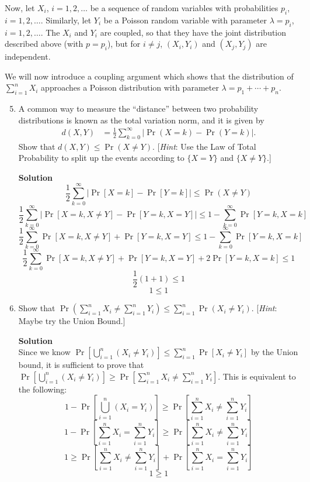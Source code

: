 \documentclass[11pt]{article}
\newenvironment{Parts}{\begin{enumerate}[label=(\alph*)]}{\end{enumerate}}
\newcommand*{\Part}{\item}
\newenvironment{Answer}{\vspace{10pt}\begin{mdframed}\textbf{Solution}\\}{\end{mdframed}\vfill\pagebreak[3]}
\newenvironment{Answer}{\vspace{10pt}}{\vfill\pagebreak[3]}
\begin{document}
Now, let $X_i$, $i = 1, 2, \dotsc$ be a sequence of random variables with probabilities $p_i$, $i = 1, 2, \dotsc$. Similarly, let $Y_i$ be a Poisson random variable with parameter $\lambda = p_i$, $i=1, 2, \dotsc$. The $X_i$ and $Y_i$ are coupled, so that they have the joint distribution described above (with $p = p_i$), but for $i \neq j$, $(X_i, Y_i)$ and $(X_j, Y_j)$ are independent.

We will now introduce a coupling argument which shows that the distribution of $\sum_{i=1}^n X_i$ approaches a Poisson distribution with parameter $\lambda = p_1 + \cdots + p_n$.

\begin{Parts}
    \setcounter{enumi}{4}
    \Part A common way to measure the ``distance'' between two probability distributions is known as the total variation norm, and it is given by
    \begin{align*}
        d(X, Y) &= \frac{1}{2} \sum_{k=0}^\infty |\Pr(X = k) - \Pr(Y = k)|.
    \end{align*}
    Show that $d(X, Y) \leq \Pr(X \neq Y)$. [\textit{Hint}: Use the Law of Total Probability to split up the events according to $\{X = Y\}$ and $\{X \neq Y\}$.]
	\begin{Answer}
    $$\frac{1}{2}\sum_{k=0}^{\infty}|{\Pr[X=k]-\Pr[Y=k]}|\leq \Pr(X \not = Y)$$ $$\frac{1}{2}\sum_{k=0}^{\infty}|\Pr[X=k, X \not = Y]-\Pr[Y=k, X=Y]| \leq 1-\sum_{k=0}^{\infty}\Pr[Y=k,X=k]$$ $$\frac{1}{2}\sum_{k=0}^{\infty}\Pr[X=k, X \not = Y]+\Pr[Y=k, X=Y] \leq 1-\sum_{k=0}^{\infty}\Pr[Y=k,X=k]$$ $$\frac{1}{2}\sum_{k=0}^{\infty}\Pr[X=k, X \not = Y]+\Pr[Y=k, X=Y]+2\Pr[Y=k, X=k] \leq 1$$ $$\frac{1}{2}(1+1) \leq 1$$
    $$1\leq 1$$
	\end{Answer}

    \Part Show that $\Pr(\sum_{i=1}^n X_i \neq \sum_{i=1}^n Y_i) \leq \sum_{i=1}^n \Pr(X_i \neq Y_i)$. [\textit{Hint}: Maybe try the Union Bound.]
	\begin{Answer}
    Since we know $\Pr[\bigcup_{i=1}^n(X_i \not = Y_i)] \leq \sum_{i=1}^n \Pr[X_i \not = Y_i]$ by the Union bound, it is sufficient to prove that $\Pr[\bigcup_{i=1}^n(X_i \not = Y_i)] \geq \Pr[\sum_{i=1}^n X_i \not = \sum_{i=1}^n Y_i]$. This is equivalent to the following: $$1-\Pr[\bigcup_{i=1}^n(X_i = Y_i)]\geq\Pr[\sum_{i=1}^n X_i \not = \sum_{i=1}^n Y_i]$$ $$1-\Pr[\sum_{i=1}^n X_i = \sum_{i=1}^n Y_i]\geq \Pr[\sum_{i=1}^n X_i \not = \sum_{i=1}^n Y_i]$$ $$1 \geq \Pr[\sum_{i=1}^n X_i \not = \sum_{i=1}^n Y_i]+\Pr[\sum_{i=1}^n X_i = \sum_{i=1}^n Y_i]$$$$1\geq 1$$
	\end{Answer}


\end{Parts}
\end{document}
